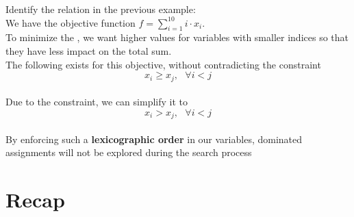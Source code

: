 \documentclass{cons-beamer}
\begin{document}
\begin{frame}
  \begin{example}
    Identify the  relation in the previous example:
    \\[+5pt]
    We have the objective function $f = \sum_{i=1}^{10} i \cdot x_i$.
    \\[+5pt]
    To minimize the , we want higher values for variables with smaller indices so that they have less impact on the total sum.
    \\[+5pt]
    The following  exists for this objective, without contradicting the constraint
    $$x_i \geq x_j, \text{ } \forall i < j$$
    \\[+5pt]
    Due to the  constraint, we can simplify it to
    $$x_i > x_j, \text{ } \forall i < j$$
    \\[+5pt]
    By enforcing such a \textbf{lexicographic order} in our variables, dominated assignments will not be explored during the search process
  \end{example}
\end{frame}

\section{Recap}
\end{document}
